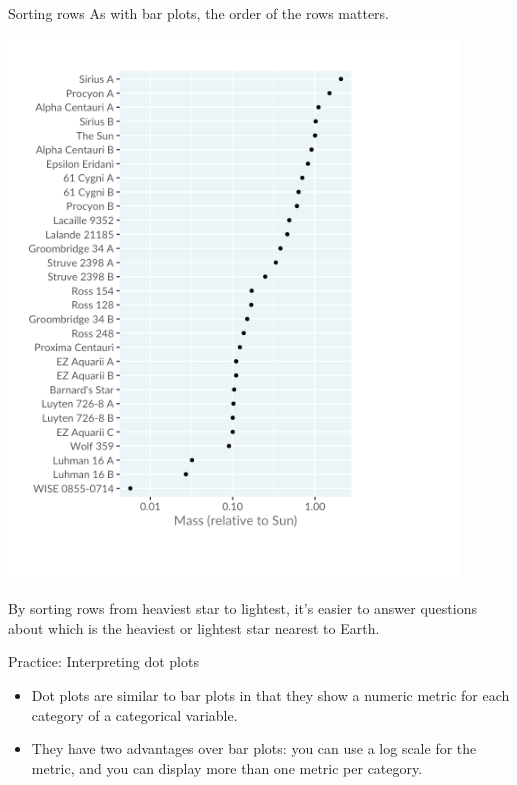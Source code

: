\documentclass[
  ignorenonframetext,
]{beamer}
\begin{document}
\begin{frame}{Sorting rows}
\label{sorting-rows}
As with bar plots, the order of the rows matters.

\includegraphics{../images/im62.png}

By sorting rows from heaviest star to lightest, it's easier to answer
questions about which is the heaviest or lightest star nearest to Earth.
\end{frame}

\begin{frame}{Practice: Interpreting dot plots}
\label{practice-interpreting-dot-plots}
\begin{itemize}
\item
  Dot plots are similar to bar plots in that they show a numeric metric
  for each category of a categorical variable.
\item
  They have two advantages over bar plots: you can use a log scale for
  the metric, and you can display more than one metric per category.
\end{itemize}
\end{frame}
\end{document}
